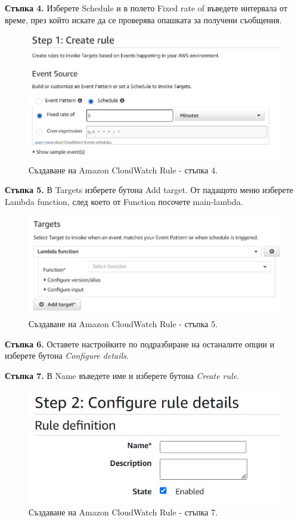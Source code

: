 \documentclass[12pt]{article}
\begin{document}
\noindent\textbf{Стъпка 4.} Изберете Schedule и в полето Fixed rate of въведете интервала от време, през който искате да се проверява опашката за получени съобщения.
\begin{figure}[h!]
\centering
    \includegraphics[scale=0.5]{instructions/cloudwatch/4.JPG}
  \caption{Създаване на Amazon CloudWatch Rule - стъпка 4.}
\end{figure}

\noindent\textbf{Стъпка 5.} В Targets изберете бутона Add target. От падащото меню изберете Lambda function, след което от Function посочете main-lambda. 
\begin{figure}[h!]
\centering
    \includegraphics[scale=0.5]{instructions/cloudwatch/5.JPG}
  \caption{Създаване на Amazon CloudWatch Rule - стъпка 5.}
\end{figure}

\noindent\textbf{Стъпка 6.} Оставете настройките по подразбиране на останалите опции и изберете бутона \textit{Configure details}.

\noindent\textbf{Стъпка 7.} В Name въведете име и изберете бутона \textit{Create rule}.
\begin{figure}[h!]
\centering
    \includegraphics[scale=0.5]{instructions/cloudwatch/7.JPG}
  \caption{Създаване на Amazon CloudWatch Rule - стъпка 7.}
\end{figure}
\end{document}
